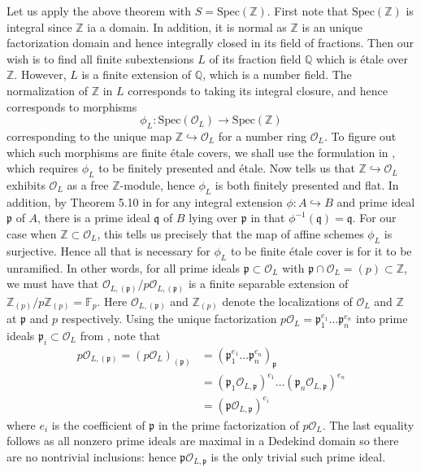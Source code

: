 \documentclass{article}
\theoremstyle{definition}
\theoremstyle{remark}
\theoremstyle{plain}
\newcommand{\Z}{\mathbb{Z}}
\newcommand{\Q}{\mathbb{Q}}
\newcommand{\mc}[1]{\mathcal{#1}}
\newcommand{\mk}[1]{\mathfrak{#1}}
\newcommand{\ic}{\cap}
\begin{document}
Let us apply the above theorem with $S = \text{Spec}(\Z)$.
First note that $\text{Spec}(\Z)$ is integral since $\Z$ ia a domain.
In addition, it is normal as $\Z$ is an unique factorization domain and hence integrally closed in its field of fractions.
Then our wish is to find all finite subextensions $L$ of its fraction field $\Q$ which is \'etale over $\Z$.
However, $L$ is a finite extension of $\Q$, which is a number field.
The normalization of $\Z$ in $L$ corresponds to taking its integral closure, and hence corresponds to morphisms
\[\phi_L: \text{Spec}(\mc{O}_L) \to \text{Spec}(\Z)\]
corresponding to the unique map $\Z \hookrightarrow \mc{O}_L$ for a number ring $\mc{O}_L$.
To figure out which such morphisms are finite \'etale covers, we shall use the formulation in , which requires $\phi_L$ to be finitely presented and \'etale.
Now  tells us that $\Z \hookrightarrow \mc{O}_L$ exhibits $\mc{O}_L$ as a free $\Z$-module, hence $\phi_L$ is both finitely presented and flat.
In addition, by Theorem 5.10 in \cite{atiyah} for any integral extension $\phi: A \hookrightarrow B$ and prime ideal $\mk{p}$ of $A$, there is a prime ideal $\mk{q}$ of $B$ lying over $\mk{p}$ in that $\phi^{-1}(\mk{q}) = \mk{q}$.
For our case when $\Z \subset \mc{O}_L$, this tells us precisely that the map of affine schemes $\phi_L$ is surjective.
Hence all that is necessary for $\phi_L$ to be finite \'etale cover is for it to be unramified.
In other words, for all prime ideals $\mk{p} \subset \mc{O}_L$  with $\mk{p} \ic \mc{O}_L = (p) \subset \Z$, we must have that $\mc{O}_{L, (\mk{p})}/ p \mc{O}_{L, (\mk{p})}$ is a finite separable extension of $\Z_{(p)}/p \Z_{(p)} = \mathbb{F}_p$.
Here $\mc{O}_{L, (\mk{p})}$ and $\Z_{(p)}$ denote the localizations of $\mc{O}_{L}$ and $\Z$ at $\mk{p}$ and $p$ respectively.
Using the unique factorization $p\mc{O}_L = \mk{p}_1^{e_1} \dots \mk{p}_n^{e_n}$ into prime ideals $\mk{p}_i \subset \mc{O}_L$ from , note that 
\begin{align*}
	p \mc{O}_{L, (\mk{p})} = (p \mc{O}_L)_{(\mk{p})} &= (\mk{p}_1^{e_1} \dots \mk{p}_n^{e_n})_{\mk{p}}\\
													 &= (\mk{p}_1 \mc{O}_{L, \mk{p}})^{e_1}\dots (\mk{p}_n \mc{O}_{L, \mk{p}})^{e_n}\\
													 &= (\mk{p} \mc{O}_{L, \mk{p}})^{e_i}
\end{align*}
where $e_i$ is the coefficient of $\mk{p}$ in the prime factorization of $p \mc{O}_L$.
The last equality follows as all nonzero prime ideals are maximal in a Dedekind domain so there are no nontrivial inclusions: hence $\mk{p} \mc{O}_{L, \mk{p}}$ is the only trivial such prime ideal.
\end{document}
